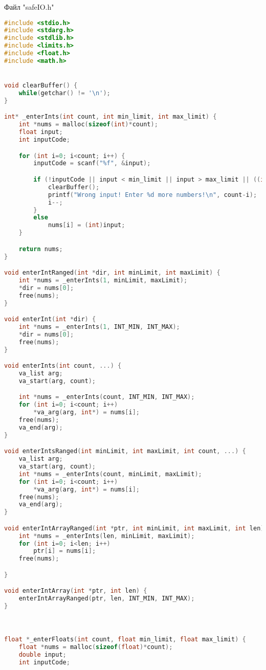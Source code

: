 \documentclass{article}
\begin{document}
Файл "safeIO.h"
\begin{lstlisting}[language=C]
#include <stdio.h>
#include <stdarg.h>
#include <stdlib.h>
#include <limits.h>
#include <float.h>
#include <math.h>


void clearBuffer() {
    while(getchar() != '\n');
}

int* _enterInts(int count, int min_limit, int max_limit) {
    int *nums = malloc(sizeof(int)*count);
    float input;
    int inputCode;

    for (int i=0; i<count; i++) {
        inputCode = scanf("%f", &input);

        if (!inputCode || input < min_limit || input > max_limit || ((int)input) != input) {
            clearBuffer();
            printf("Wrong input! Enter %d more numbers!\n", count-i);
            i--;
        }
        else
            nums[i] = (int)input;
    }

    return nums;
}

void enterIntRanged(int *dir, int minLimit, int maxLimit) {
    int *nums = _enterInts(1, minLimit, maxLimit);
    *dir = nums[0];
    free(nums);
}

void enterInt(int *dir) {
    int *nums = _enterInts(1, INT_MIN, INT_MAX);
    *dir = nums[0];
    free(nums);
}

void enterInts(int count, ...) {
    va_list arg;
    va_start(arg, count);

    int *nums = _enterInts(count, INT_MIN, INT_MAX);
    for (int i=0; i<count; i++)
        *va_arg(arg, int*) = nums[i];
    free(nums);
    va_end(arg);
}

void enterIntsRanged(int minLimit, int maxLimit, int count, ...) {
    va_list arg;
    va_start(arg, count);
    int *nums = _enterInts(count, minLimit, maxLimit);
    for (int i=0; i<count; i++)
        *va_arg(arg, int*) = nums[i];
    free(nums);
    va_end(arg);
}

void enterIntArrayRanged(int *ptr, int minLimit, int maxLimit, int len) {
    int *nums = _enterInts(len, minLimit, maxLimit);
    for (int i=0; i<len; i++)
        ptr[i] = nums[i];
    free(nums);

}

void enterIntArray(int *ptr, int len) {
    enterIntArrayRanged(ptr, len, INT_MIN, INT_MAX);
}



float *_enterFloats(int count, float min_limit, float max_limit) {
    float *nums = malloc(sizeof(float)*count);
    double input;
    int inputCode;


\end{lstlisting}
\end{document}
